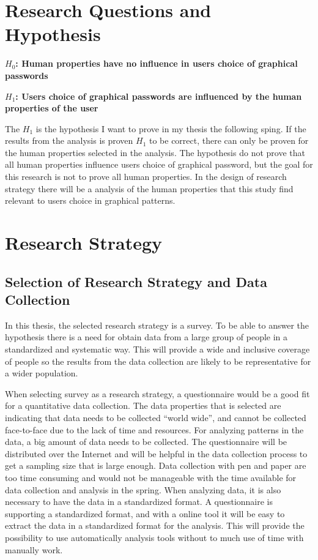 \section{Research Questions and Hypothesis}
    
  {\bf $H_{0}$: Human properties have no influence in users choice of graphical passwords} 

  {\bf $H_{1}$: Users choice of graphical passwords are influenced by the human properties of the user}

  The $H_{1}$ is the hypothesis I want to prove in my thesis the following sping. If the results from the analysis is proven $H_{1}$ to be correct, there can only be proven for the human properties selected in the analysis. The hypothesis do not prove that all human properties influence users choice of graphical password, but the goal for this research is not to prove all human properties. In the design of research strategy there will be a analysis of the human properties that this study find relevant to users choice in graphical patterns. 

\section{Research Strategy}

  \subsection{Selection of Research Strategy and Data Collection}

    In this thesis, the selected research strategy is a survey. To be able to answer the hypothesis there is a need for obtain data from a large group of people in a standardized and systematic way. This will provide a wide and inclusive coverage of people so the results from the data collection are likely to be representative for a wider population. 

    When selecting survey as a research strategy, a questionnaire would be a good fit for a quantitative data collection. The data properties that is selected are indicating that data needs to be collected ``world wide'', and cannot be collected face-to-face due to the lack of time and resources. For analyzing patterns in the data, a big amount of data needs to be collected. The questionnaire will be distributed over the Internet and will be helpful in the data collection process to get a sampling size that is large enough. Data collection with pen and paper are too time consuming and would not be manageable with the time available for data collection and analysis in the spring. When analyzing data, it is also necessary to have the data in a standardized format. A questionnaire is supporting a standardized format, and with a online tool it will be easy to extract the data in a standardized format for the analysis. This will provide the possibility to use automatically analysis tools without to much use of time with manually work.

